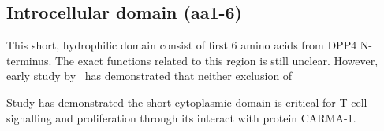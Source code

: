 \subsection{Introcellular domain (aa1-6)}

This short, hydrophilic domain consist of first 6 amino acids from DPP4 N-terminus. The exact functions related to this region is still unclear. However, early study by~\citet{Hong1990} has demonstrated that neither exclusion of 

Study has demonstrated the short cytoplasmic domain is critical for T-cell signalling and proliferation through its interact with protein CARMA-1. \cite{Ohnuma_2007}